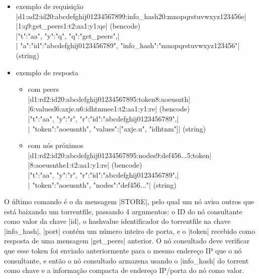 
\newpage
\begin{itemize}
    \item exemplo de requisição \\
        \bverb|d1:ad2:id20:abcdefghij01234567899:info_hash20:mnopqrstuvwxyz123456e|\\
        \bverb|1:q9:get_peers1:t2:aa1:y1:qe| (\gls*{bencode}) \\
        \sverb|{"t":"aa", "y":"q", "q":"get_peers",|\\
        \sverb| "a":{"id":"abcdefghij0123456789", "info_hash":"mnopqrstuvwxyz123456"}}| (\gls*{string})

    \item exemplo de resposta
        \begin{itemize}
            \item com peers \\
                \bverb|d1:rd2:id20:abcdefghij01234567895:token8:aoeusnth|\\
                \bverb|6:valuesl6:axje.u6:idhtnmee1:t2:aa1:y1:re| (\gls*{bencode}) \\
                \sverb|{"t":"aa", "y":"r", "r":{"id":"abcdefghij0123456789",|\\
                \sverb| "token":"aoeusnth", "values":["axje.u", "idhtnm"]}}|
                (\gls*{string})

            \item com nós próximos \\
                \bverb|d1:rd2:id20:abcdefghij01234567895:nodes9:def456...5:token|\\\bverb|8:aoeusnthe1:t2:aa1:y1:re| (\gls*{bencode}) \\
                \sverb|{"t":"aa", "y":"r", "r":{"id":"abcdefghij0123456789",|\\
                \sverb| "token":"aoeusnth", "nodes":"def456..."}}| (\gls*{string})
        \end{itemize}
\end{itemize}


O último comando é o da mensagem \bverb|STORE|, pelo qual um nó avisa outros que está
baixando um \gls*{torrentfile}, passando 4 argumentos: o ID do nó consultante como
valor da chave \bverb|id|, o \gls*{hashvalue} identificador do \gls*{torrentfile} na
chave \bverb|info_hash|, \bverb|port| contém um número inteiro de porta, e o
\bverb|token| recebido como resposta de uma mensagem \bverb|get_peers| anterior. O nó
consultado deve verificar que esse token foi enviado anteriormente para o mesmo endereço
IP que o nó consultante, e então o nó consultado armazena usando o \bverb|info_hash| do
torrent como chave e a informação compacta de endereço IP/porta do nó como valor.

